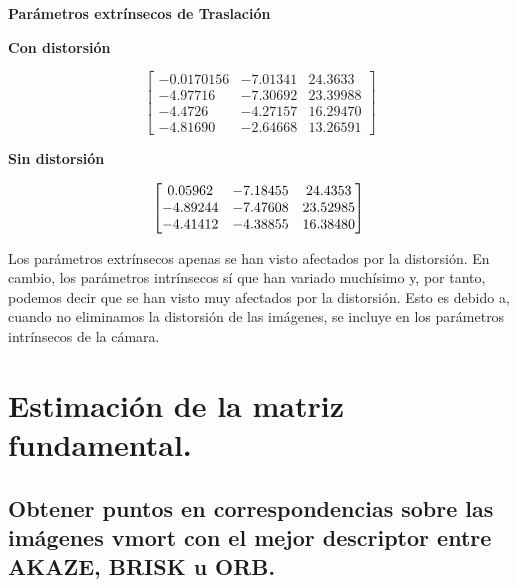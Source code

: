 \documentclass[11pt,a4paper]{article}
\theoremstyle{plain}
\theoremstyle{definition}
\begin{document}
\begin{center}
    {\LARGE \textbf{Parámetros extrínsecos de Traslación}}
\end{center}
\begin{minipage}{0.5\textwidth}
\begin{center}
{\Large \textbf{Con distorsión}}
\end{center}
\begin{displaymath}
\left[
\begin{matrix}
-0.0170156 & -7.01341 &  24.3633 \\
-4.97716 & -7.30692 & 23.39988 \\
-4.4726  & -4.27157 & 16.29470 \\
-4.81690 & -2.64668 & 13.26591
\end{matrix}
\right] 
\end{displaymath}
\end{minipage}
\begin{minipage}{0.5\textwidth}
\begin{center}
{\Large \textbf{Sin distorsión}}
\end{center}
\begin{displaymath}
\left[
\begin{matrix}
0.05962 & -7.18455 & 24.4353  \\
-4.89244 & -7.47608 & 23.52985 \\
-4.41412 & -4.38855 & 16.38480
\end{matrix}
\right] \\
\end{displaymath}
\end{minipage}

Los parámetros extrínsecos apenas se han visto afectados por la distorsión. En cambio, los parámetros intrínsecos sí que han variado muchísimo y, por tanto, podemos decir que se han visto muy afectados por la distorsión. Esto es debido a, cuando no eliminamos la distorsión de las imágenes, se incluye en los parámetros intrínsecos de la cámara.

\section{Estimación de la matriz fundamental.}

\subsection{Obtener puntos en correspondencias sobre las imágenes vmort con el mejor descriptor entre AKAZE, BRISK u ORB.}
\end{document}
